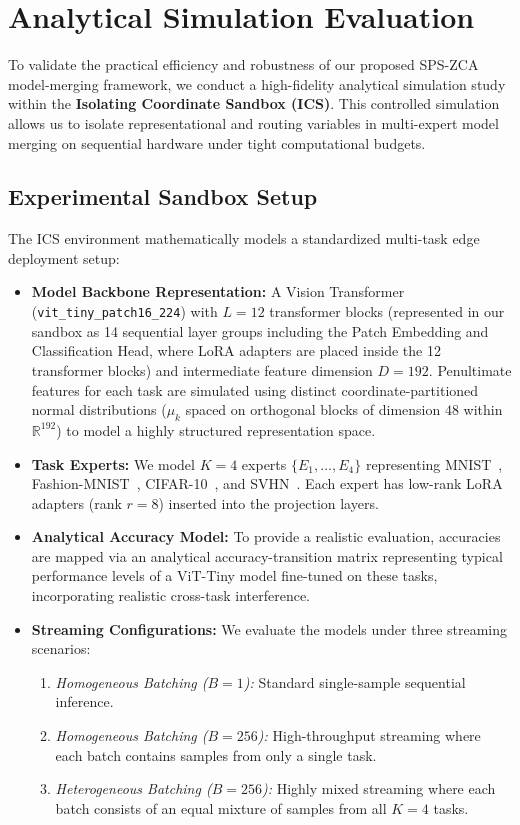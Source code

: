 \section{Analytical Simulation Evaluation}
\label{sec:experiments}

To validate the practical efficiency and robustness of our proposed SPS-ZCA model-merging framework, we conduct a high-fidelity analytical simulation study within the \textbf{Isolating Coordinate Sandbox (ICS)}.
This controlled simulation allows us to isolate representational and routing variables in multi-expert model merging on sequential hardware under tight computational budgets.


\subsection{Experimental Sandbox Setup}
\label{subsec:setup}
The ICS environment mathematically models a standardized multi-task edge deployment setup:
\begin{itemize}
    \item \textbf{Model Backbone Representation:} A Vision Transformer~\cite{dosovitskiy2020image} (\texttt{vit\_tiny\_patch16\_224}) with $L=12$ transformer blocks (represented in our sandbox as 14 sequential layer groups including the Patch Embedding and Classification Head, where LoRA adapters are placed inside the 12 transformer blocks) and intermediate feature dimension $D=192$.
Penultimate features for each task are simulated using distinct coordinate-partitioned normal distributions ($\mu_k$ spaced on orthogonal blocks of dimension $48$ within $\mathbb{R}^{192}$) to model a highly structured representation space.

    \item \textbf{Task Experts:} We model $K=4$ experts $\{E_1, \dots, E_4\}$ representing MNIST~\cite{lecun1998gradient}, Fashion-MNIST~\cite{xiao2017fashion}, CIFAR-10~\cite{krizhevsky2009learning}, and SVHN~\cite{netzer2011reading}.
Each expert has low-rank LoRA adapters (rank $r=8$) inserted into the projection layers.

    \item \textbf{Analytical Accuracy Model:} To provide a realistic evaluation, accuracies are mapped via an analytical accuracy-transition matrix representing typical performance levels of a ViT-Tiny model fine-tuned on these tasks, incorporating realistic cross-task interference.
    \item \textbf{Streaming Configurations:} We evaluate the models under three streaming scenarios:
    \begin{enumerate}
        \item \textit{Homogeneous Batching ($B=1$):} Standard single-sample sequential inference.
        \item \textit{Homogeneous Batching ($B=256$):} High-throughput streaming where each batch contains samples from only a single task.
        \item \textit{Heterogeneous Batching ($B=256$):} Highly mixed streaming where each batch consists of an equal mixture of samples from all $K=4$ tasks.
    \end{enumerate}
\end{itemize}

